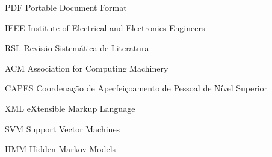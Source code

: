 \begin{siglas}
  \item[PDF] Portable Document Format
  \item[IEEE] Institute of Electrical and Electronics Engineers
  \item[RSL] Revisão Sistemática de Literatura
  \item[ACM] Association for Computing Machinery
  \item[CAPES] Coordenação de Aperfeiçoamento de Pessoal de Nível Superior
  \item[XML] eXtensible Markup Language
  \item[SVM] Support Vector Machines
  \item[HMM] Hidden Markov Models
\end{siglas}